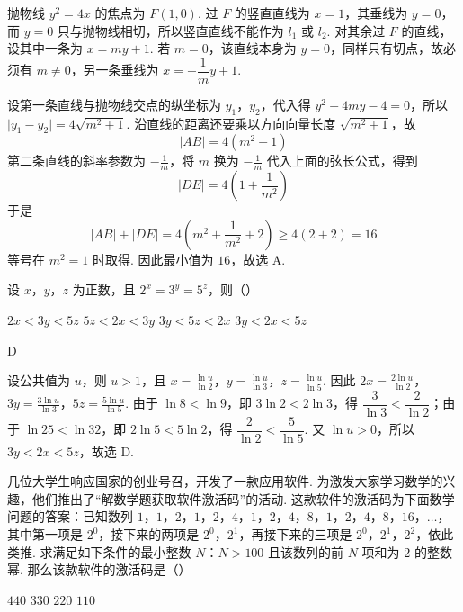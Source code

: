 \begin{solution}
抛物线 \(y^2=4x\) 的焦点为 \(F(1,0)\). 过 \(F\) 的竖直直线为 \(x=1\)，其垂线为 \(y=0\)，而 \(y=0\) 只与抛物线相切，所以竖直直线不能作为 \(l_1\) 或 \(l_2\). 对其余过 \(F\) 的直线，设其中一条为 \(x=my+1\). 若 \(m=0\)，该直线本身为 \(y=0\)，同样只有切点，故必须有 \(m\ne0\)，另一条垂线为 \(x=-\dfrac1m y+1\).

设第一条直线与抛物线交点的纵坐标为 \(y_1\)，\(y_2\)，代入得 \(y^2-4my-4=0\)，所以 \(\lvert y_1-y_2\rvert=4\sqrt{m^2+1}\). 沿直线的距离还要乘以方向向量长度 \(\sqrt{m^2+1}\)，故
\[
\lvert AB\rvert=4(m^2+1)
\]
第二条直线的斜率参数为 \(-\frac{1}{m}\)，将 \(m\) 换为 \(-\frac{1}{m}\) 代入上面的弦长公式，得到
\[
\lvert DE\rvert=4\left(1+\frac1{m^2}\right)
\]
于是
\[
\lvert AB\rvert+\lvert DE\rvert
=4\left(m^2+\frac1{m^2}+2\right)
\ge4(2+2)=16
\]
等号在 \(m^2=1\) 时取得. 因此最小值为 \(16\)，故选 A.
\end{solution}

\begin{problem}
设 \(x\)，\(y\)，\(z\) 为正数，且 \(2^x=3^y=5^z\)，则（\quad）

\choices
    {\(2x<3y<5z\)}
    {\(5z<2x<3y\)}
    {\(3y<5z<2x\)}
    {\(3y<2x<5z\)}
\end{problem}

\begin{answer}
D
\end{answer}

\begin{solution}
设公共值为 \(u\)，则 \(u>1\)，且
\(x=\frac{\ln u}{\ln2}\)，\(y=\frac{\ln u}{\ln3}\)，\(z=\frac{\ln u}{\ln5}\).
因此
\(2x=\frac{2\ln u}{\ln2}\)，\(3y=\frac{3\ln u}{\ln3}\)，\(5z=\frac{5\ln u}{\ln5}\).
由于 \(\ln8<\ln9\)，即 \(3\ln2<2\ln3\)，得 \(\dfrac3{\ln3}<\dfrac2{\ln2}\)；由于 \(\ln25<\ln32\)，即 \(2\ln5<5\ln2\)，得 \(\dfrac2{\ln2}<\dfrac5{\ln5}\). 又 \(\ln u>0\)，所以 \(3y<2x<5z\)，故选 D.
\end{solution}

\begin{problem}
几位大学生响应国家的创业号召，开发了一款应用软件. 为激发大家学习数学的兴趣，他们推出了“解数学题获取软件激活码”的活动. 这款软件的激活码为下面数学问题的答案：已知数列 \(1\)，\(1\)，\(2\)，\(1\)，\(2\)，\(4\)，\(1\)，\(2\)，\(4\)，\(8\)，\(1\)，\(2\)，\(4\)，\(8\)，\(16\)，\(\dots\)，其中第一项是 \(2^0\)，接下来的两项是 \(2^0\)，\(2^1\)，再接下来的三项是 \(2^0\)，\(2^1\)，\(2^2\)，依此类推. 求满足如下条件的最小整数 \(N\)：\(N>100\) 且该数列的前 \(N\) 项和为 \(2\) 的整数幂. 那么该款软件的激活码是（\quad）

\choices
    {\(440\)}
    {\(330\)}
    {\(220\)}
    {\(110\)}
\end{problem}

